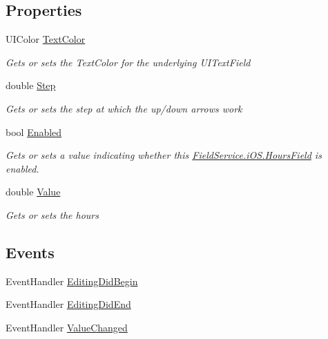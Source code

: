 \subsection*{Properties}
\begin{DoxyCompactItemize}
\item 
U\+I\+Color \hyperlink{class_field_service_1_1i_o_s_1_1_hours_field_a6e425d3081b5e375bba019332a4516bb}{Text\+Color}
\begin{DoxyCompactList}\small\item\em Gets or sets the Text\+Color for the underlying U\+I\+Text\+Field \end{DoxyCompactList}\item 
double \hyperlink{class_field_service_1_1i_o_s_1_1_hours_field_a18e5c93c4287d0a5653c391b92c540b1}{Step}
\begin{DoxyCompactList}\small\item\em Gets or sets the step at which the up/down arrows work \end{DoxyCompactList}\item 
bool \hyperlink{class_field_service_1_1i_o_s_1_1_hours_field_a4a5f0dbd5b98c259770858e31d4c7a78}{Enabled}
\begin{DoxyCompactList}\small\item\em Gets or sets a value indicating whether this \hyperlink{class_field_service_1_1i_o_s_1_1_hours_field}{Field\+Service.\+i\+O\+S.\+Hours\+Field} is enabled. \end{DoxyCompactList}\item 
double \hyperlink{class_field_service_1_1i_o_s_1_1_hours_field_abae39462b0927207acb20d319bace78c}{Value}
\begin{DoxyCompactList}\small\item\em Gets or sets the hours \end{DoxyCompactList}\end{DoxyCompactItemize}
\subsection*{Events}
\begin{DoxyCompactItemize}
\item 
Event\+Handler \hyperlink{class_field_service_1_1i_o_s_1_1_hours_field_a620f38523cb743ebced6cc01bc13fc74}{Editing\+Did\+Begin}
\item 
Event\+Handler \hyperlink{class_field_service_1_1i_o_s_1_1_hours_field_a1a7138f210603946fc7a0f39470d8ab7}{Editing\+Did\+End}
\item 
Event\+Handler \hyperlink{class_field_service_1_1i_o_s_1_1_hours_field_ac70fa977a4123616aeabfcf938ef7d52}{Value\+Changed}
\end{DoxyCompactItemize}


